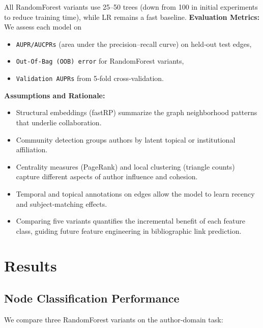 \documentclass[conference]{IEEEtran}
\begin{document}
\noindent All RandomForest variants use 25–50 trees (down from 100 in initial experiments to reduce training time), while LR remains a fast baseline.  
\newline \newline 
\noindent\textbf{Evaluation Metrics:}\\
We assess each model on
\begin{itemize}
  \item \texttt{AUPR/AUCPRs} (area under the precision–recall curve) on held‐out test edges,  
  \item \texttt{Out‐Of‐Bag (OOB) error} for RandomForest variants,  
  \item \texttt{Validation AUPRs} from 5‐fold cross‐validation.
\end{itemize}

\noindent\textbf{\newline Assumptions and Rationale:}
\begin{itemize}
  \item Structural embeddings (fastRP) summarize the graph neighborhood patterns that underlie collaboration.  
  \item Community detection groups authors by latent topical or institutional affiliation.  
  \item Centrality measures (PageRank) and local clustering (triangle counts) capture different aspects of author influence and cohesion.  
  \item Temporal and topical annotations on edges allow the model to learn recency and subject‐matching effects.  
  \item Comparing five variants quantifies the incremental benefit of each feature class, guiding future feature engineering in bibliographic link prediction.  
\end{itemize}


\section{Results}
\subsection{Node Classification Performance}

\noindent We compare three RandomForest variants on the author‐domain task:
\end{document}
